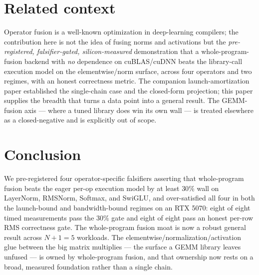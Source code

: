 \documentclass[11pt,a4paper]{article}
\begin{document}
\section{Related context}
\label{sec:related}

Operator fusion is a well-known optimization in deep-learning compilers; the
contribution here is not the idea of fusing norms and activations but the
\emph{pre-registered, falsifier-gated, silicon-measured} demonstration that a
whole-program-fusion backend with \emph{no} dependence on cuBLAS/cuDNN beats the
library-call execution model on the elementwise/norm surface, across four
operators and two regimes, with an honest correctness metric. The companion
launch-amortization paper established the single-chain case and the closed-form
projection; this paper supplies the breadth that turns a data point into a
general result. The GEMM-fusion axis --- where a tuned library does win its own
wall --- is treated elsewhere as a closed-negative and is explicitly out of
scope.

\section{Conclusion}
\label{sec:conclusion}

We pre-registered four operator-specific falsifiers asserting that whole-program
fusion beats the eager per-op execution model by at least $30\%$ wall on
LayerNorm, RMSNorm, Softmax, and SwiGLU, and over-satisfied all four in both the
launch-bound and bandwidth-bound regimes on an RTX 5070: eight of eight timed
measurements pass the $30\%$ gate and eight of eight pass an honest per-row RMS
correctness gate. The whole-program fusion moat is now a robust general result
across $N+1=5$ workloads. The elementwise/normalization/activation glue between
the big matrix multiplies --- the surface a GEMM library leaves unfused --- is
owned by whole-program fusion, and that ownership now rests on a broad, measured
foundation rather than a single chain.



\end{document}
